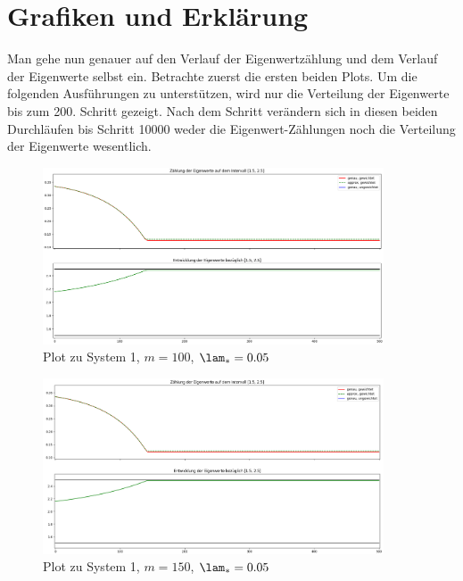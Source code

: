 \documentclass[a4paper,12pt]{report}
\newcommand{\1}{\mathds{1}}
\theoremstyle{plain} %
\theoremstyle{definition} %
\theoremstyle{remark}
\begin{document}
      \section{Grafiken und Erklärung}
            Man gehe nun genauer auf den Verlauf der Eigenwertzählung und dem Verlauf der Eigenwerte selbst ein.
            Betrachte zuerst die ersten beiden Plots.
            Um die folgenden Ausführungen zu unterstützen, wird nur die Verteilung der Eigenwerte bis zum 200. Schritt gezeigt.
            Nach dem Schritt verändern sich in diesen beiden Durchläufen bis Schritt 10000 weder die Eigenwert-Zählungen noch die Verteilung der Eigenwerte wesentlich.
            \begin{figure}[ht]
                  \centering
                  \includegraphics[width=0.9\textwidth, keepaspectratio]{./Original/Plot_1_100_0.05.png}
                  \caption{Plot zu System 1, $m=100$, $\lam_*=0.05$}
                  \label{fig: Plot_1_100_0.05}
            \end{figure}

            \begin{figure}[ht]
                  \centering
                  \includegraphics[width=0.9\textwidth, keepaspectratio]{./Original/Plot_1_150_0.05.png}
                  \caption{Plot zu System 1, $m=150$, $\lam_*=0.05$}
                  \label{fig: Plot_1_150_0.05}
            \end{figure}
\end{document}
